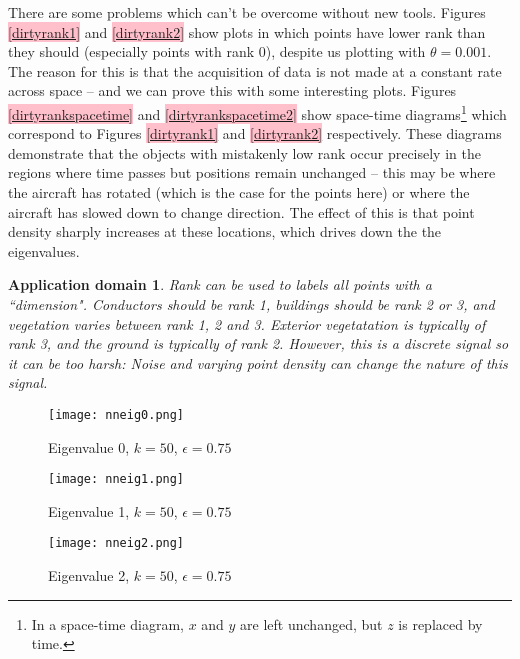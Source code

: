 \documentclass[a4paper,11pt,twoside]{article}
\newtheorem*{appdom}{Application domain}
\theoremstyle{definition}
\theoremstyle{remark}
\newcommand{\sh}[1]{\colorbox{pink}{#1}}
\newcommand{\lnk}[1]{\sh{\hyperref[#1]{\ref*{#1}}}}
\newenvironment{app}
   {\colorlet{shadecolor}{red!50}\begin{shaded}\begin{appdom}}
   {\end{appdom}\end{shaded}}
\begin{document}
There are some problems which can't be overcome without new tools. Figures \lnk{dirtyrank1} and \lnk{dirtyrank2} show plots in which points have lower rank than they should (especially points with rank $0$), despite us plotting with $\theta =0.001$. The reason for this is that the acquisition of data is not made at a constant rate across space -- and we can prove this with some interesting plots. Figures \lnk{dirtyrankspacetime} and \lnk{dirtyrankspacetime2} show space-time diagrams\footnote{In a space-time diagram, $x$ and $y$ are left unchanged, but $z$ is replaced by time.} which correspond to Figures \lnk{dirtyrank1} and \lnk{dirtyrank2} respectively. These diagrams demonstrate that the objects with mistakenly low rank occur precisely in the regions where time passes but positions remain unchanged -- this may be where the aircraft has rotated (which is the case for the points here) or where the aircraft has slowed down to change direction. The effect of this is that point density sharply increases at these locations, which drives down the the eigenvalues.
\begin{app}Rank can be used to labels all points with a ``dimension". Conductors should be rank 1, buildings should be rank 2 or 3, and vegetation varies between rank 1, 2 and 3. Exterior vegetatation is typically of rank 3, and the ground is typically of rank 2. However, this is a discrete signal so it can be too harsh: Noise and varying point density can change the nature of this signal.
\end{app}
\newpage
\begin{figure}[!h]
  \caption{Eigenvalue 0, $k=50$, $\epsilon = 0.75$}
  \centering
    \texttt{[image: nneig0.png]}
    \label{nneig0}
\end{figure}
\begin{figure}[!h]
  \caption{Eigenvalue 1, $k=50$, $\epsilon = 0.75$}
  \centering
    \texttt{[image: nneig1.png]}
    \label{nneig1}
\end{figure}
\newpage
\begin{figure}[!h]
  \caption{Eigenvalue 2, $k=50$, $\epsilon = 0.75$}
  \centering
    \texttt{[image: nneig2.png]}
    \label{nneig2}
\end{figure}
\end{document}
